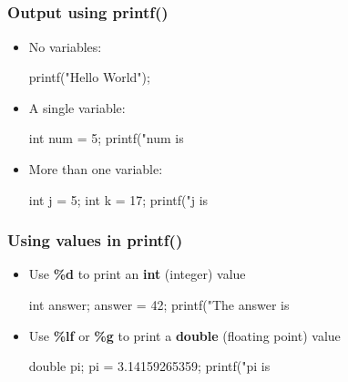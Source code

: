\subsection{}
\begin{frame}[fragile=singleslide]
\frametitle{Output using printf()}

\begin{itemize}

\item No variables:
\begin{C}
printf("Hello World\n");
\end{C}

\item A single variable:
\begin{C}
int num = 5;
printf("num is %
\end{C}

\item More than one variable:
\begin{C}
int j = 5;
int k = 17;
printf("j is %
\end{C}
\end{itemize}

\end{frame}

\begin{frame}[fragile=singleslide]
\frametitle{Using  values in printf()}
\begin{itemize}
\item Use {\bf \%d} to print an {\bf int} (integer) value
\begin{C}
int answer;
answer = 42;
printf("The answer is %
\end{C}
\item Use {\bf \%lf} or {\bf \%g} to print a {\bf double} (floating point) value
\begin{C}
double pi;
pi = 3.14159265359;
printf("pi is %
\end{C}
\end{itemize}
\end{frame}

